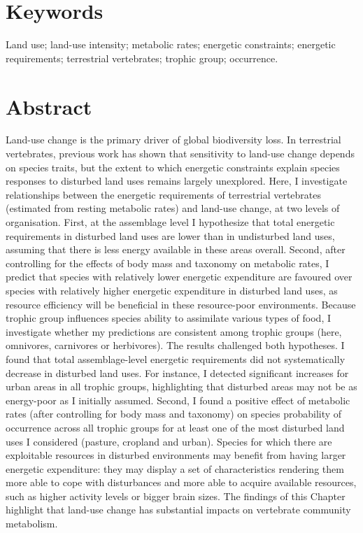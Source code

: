 
\section*{Keywords}
Land use; land-use intensity; metabolic rates; energetic constraints; energetic requirements; terrestrial vertebrates; trophic group; occurrence.

\section*{Abstract}
Land-use change is the primary driver of global biodiversity loss. In terrestrial vertebrates, previous work has shown that sensitivity to land-use change depends on species traits, but the extent to which energetic constraints explain species responses to disturbed land uses remains largely unexplored. Here, I investigate relationships between the energetic requirements of terrestrial vertebrates (estimated from resting metabolic rates) and land-use change, at two levels of organisation. First, at the assemblage level I hypothesize that total energetic requirements in disturbed land uses are lower than in undisturbed land uses, assuming that there is less energy available in these areas overall. Second, after controlling for the effects of body mass and taxonomy on metabolic rates, I predict that species with relatively lower energetic expenditure are favoured over species with relatively higher energetic expenditure in disturbed land uses, as resource efficiency will be beneficial in these resource-poor environments. Because trophic group   influences species ability to assimilate various types of food, I investigate whether my predictions are consistent among trophic groups (here, omnivores, carnivores or herbivores).
The results challenged both hypotheses. I found that total assemblage-level energetic requirements did not systematically decrease in disturbed land uses. For instance, I detected significant increases for urban areas in all trophic groups, highlighting that disturbed areas may not be as energy-poor as I initially assumed. Second, I found a positive effect of metabolic rates (after controlling for body mass and taxonomy) on species probability of occurrence across all trophic groups for at least one of the most disturbed land uses I considered (pasture, cropland and urban). Species for which there are exploitable resources in disturbed environments may benefit from having larger energetic expenditure: they may display a set of characteristics rendering them more able to cope with disturbances and more able to acquire available resources, such as higher activity levels or bigger brain sizes. The findings of this Chapter highlight that land-use change has  substantial impacts on vertebrate community metabolism.   


